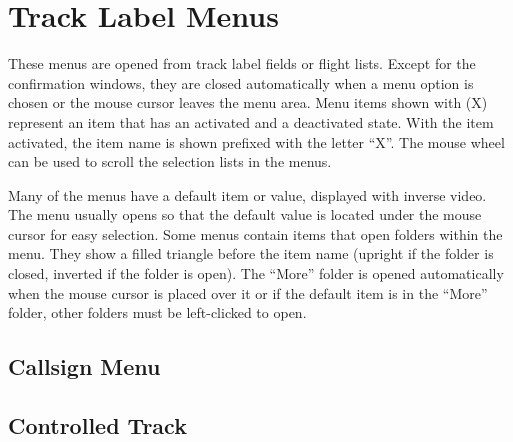 \documentclass[a4paper,oneside,11pt]{memoir}
\newcommand\capdimage[2]{
\begin{center}
\hspace{1em}%
\vtop{%
\centering
\texttt{[image: \#1]}%
\captionof{figure}{#2}%
}%
\end{center}
\ignorespaces}
\begin{document}
\section{Track Label Menus}

These menus are opened from track label fields or flight lists. Except for the confirmation windows, they are closed automatically when a menu option is chosen or the mouse cursor leaves the menu area. Menu items shown with (X) represent an item that has an activated and a deactivated state. With the item activated, the item name is shown prefixed with the letter “X”. The mouse wheel can be used to scroll the selection lists in the menus.

\bigskip

Many of the menus have a default item or value, displayed with inverse video. The menu usually opens so that the default value is located under the mouse cursor for easy selection. Some menus contain items that open folders within the menu. They show a filled triangle before the item name (upright if the folder is closed, inverted if the folder is open). The “More” folder is opened automatically when the mouse cursor is placed over it or if the default item is in the “More” folder, other folders must be left-clicked to open.

\subsection{Callsign Menu}
\label{menu:cs}

\subsection*{Controlled Track}

\capdimage{img/cm.png}{Callsign Menu}
\end{document}
